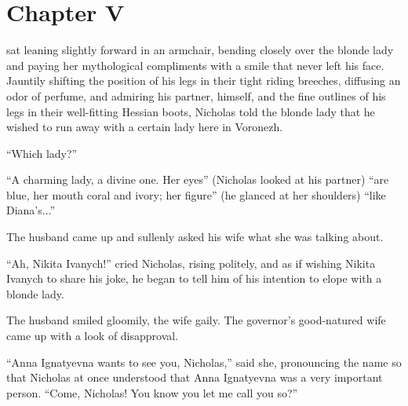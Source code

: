 
\chapter*{Chapter V} \ifaudio {}
\fi

 sat leaning slightly forward in an armchair, bending
closely over the blonde lady and paying her mythological
compliments with a smile that never left his face. Jauntily
shifting the position of his legs in their tight riding breeches,
diffusing an odor of perfume, and admiring his partner, himself,
and the fine outlines of his legs in their well-fitting Hessian
boots, Nicholas told the blonde lady that he wished to run away
with a certain lady here in Voronezh.

``Which lady?''

``A charming lady, a divine one. Her eyes'' (Nicholas looked at
his partner) ``are blue, her mouth coral and ivory; her figure''
(he glanced at her shoulders) ``like Diana's...''

The husband came up and sullenly asked his wife what she was
talking about.

``Ah, Nikita Ivanych!'' cried Nicholas, rising politely, and as
if wishing Nikita Ivanych to share his joke, he began to tell him
of his intention to elope with a blonde lady.

The husband smiled gloomily, the wife gaily. The governor's
good-natured wife came up with a look of disapproval.

``Anna Ignatyevna wants to see you, Nicholas,'' said she,
pronouncing the name so that Nicholas at once understood that
Anna Ignatyevna was a very important person. ``Come, Nicholas!
You know you let me call you so?''


